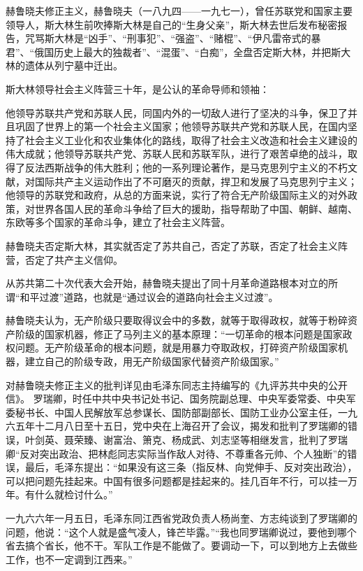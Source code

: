 \begin{maonote}
赫鲁晓夫修正主义，赫鲁晓夫（一八九四——一九七一），曾任苏联党和国家主要领导人，斯大林生前吹捧斯大林是自己的“生身父亲”，斯大林去世后发布秘密报告，咒骂斯大林是“凶手”、“刑事犯”、“强盗”、“赌棍”、“伊凡雷帝式的暴君”、“俄国历史上最大的独裁者”、“混蛋”、“白痴”，全盘否定斯大林，并把斯大林的遗体从列宁墓中迁出。

斯大林领导社会主义阵营三十年，是公认的革命导师和领袖：

他领导苏联共产党和苏联人民，同国内外的一切敌人进行了坚决的斗争，保卫了并且巩固了世界上的第一个社会主义国家；他领导苏联共产党和苏联人民，在国内坚持了社会主义工业化和农业集体化的路线，取得了社会主义改造和社会主义建设的伟大成就；他领导苏联共产党、苏联人民和苏联军队，进行了艰苦卓绝的战斗，取得了反法西斯战争的伟大胜利；他的一系列理论著作，是马克思列宁主义的不朽文献，对国际共产主义运动作出了不可磨灭的贡献，捍卫和发展了马克思列宁主义；他领导的苏联党和政府，从总的方面来说，实行了符合无产阶级国际主义的对外政策，对世界各国人民的革命斗争给了巨大的援助，指导帮助了中国、朝鲜、越南、东欧等多个国家的革命斗争，建立了社会主义阵营。

赫鲁晓夫否定斯大林，其实就否定了苏共自己，否定了苏联，否定了社会主义阵营，否定了共产主义信仰。

从苏共第二十次代表大会开始，赫鲁晓夫提出了同十月革命道路根本对立的所谓“和平过渡”道路，也就是“通过议会的道路向社会主义过渡”。

赫鲁晓夫认为，无产阶级只要取得议会中的多数，就等于取得政权，就等于粉碎资产阶级的国家机器，修正了马列主义的基本原理：“一切革命的根本问题是国家政权问题。无产阶级革命的根本问题，就是用暴力夺取政权，打碎资产阶级国家机器，建立自己的阶级专政，用无产阶级国家代替资产阶级国家。”

对赫鲁晓夫修正主义的批判详见由毛泽东同志主持编写的《九评苏共中央的公开信》。
罗瑞卿，时任中共中央书记处书记、国务院副总理、中央军委常委、中央军委秘书长、中国人民解放军总参谋长、国防部副部长、国防工业办公室主任，一九六五年十二月八日至十五日，党中央在上海召开了会议，揭发和批判了罗瑞卿的错误，叶剑英、聂荣臻、谢富治、箫克、杨成武、刘志坚等相继发言，批判了罗瑞卿“反对突出政治、把林彪同志实际当作敌人对待、不尊重各元帅、个人独断”的错误，最后，毛泽东提出：“如果没有这三条（指反林、向党伸手、反对突出政治），可以把问题先挂起来。中国有很多问题都是挂起来的。挂几百年不行，可以挂一万年。有什么就检讨什么。”

一九六六年一月五日，毛泽东同江西省党政负责人杨尚奎、方志纯谈到了罗瑞卿的问题，他说：“这个人就是盛气凌人，锋芒毕露。”“我也同罗瑞卿说过，要他到哪个省去搞个省长，他不干。军队工作是不能做了。要调动一下，可以到地方上去做些工作，也不一定调到江西来。”


\end{maonote}
